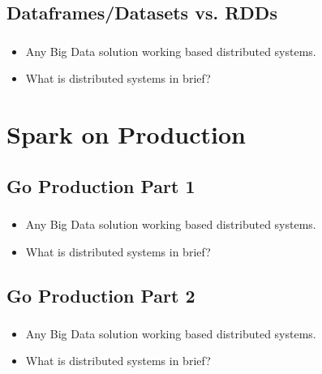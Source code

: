 
\subsection{Dataframes/Datasets vs. RDDs}

\begin{frame}
  \frametitle{\subsecname}
	\begin{itemize}[<+->]
		\item Any Big Data solution working based distributed systems.
		\item What is distributed systems in brief?
	\end{itemize}
\end{frame}

\section{Spark on Production}

\subsection{Go Production Part 1}
\begin{frame}
  \frametitle{\subsecname}
	\begin{itemize}[<+->]
		\item Any Big Data solution working based distributed systems.
		\item What is distributed systems in brief?
	\end{itemize}
\end{frame}

\subsection{Go Production Part 2}

\begin{frame}
  \frametitle{\subsecname}
	\begin{itemize}[<+->]
		\item Any Big Data solution working based distributed systems.
		\item What is distributed systems in brief?
	\end{itemize}
\end{frame}


